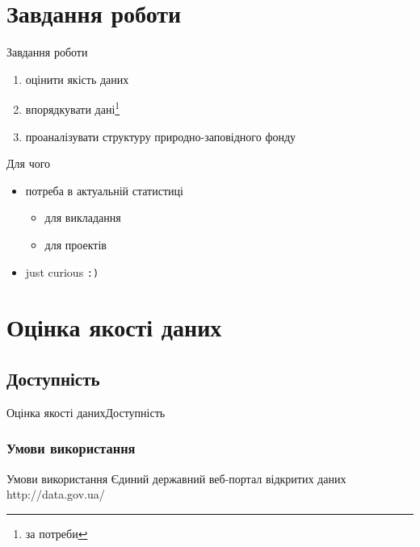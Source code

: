 \documentclass[12pt, aspectratio=1610]{beamer}
\begin{document}
\section{Завдання роботи}
\begin{frame}{Завдання роботи}
   \begin{enumerate}
    \item оцінити якість даних
    \item впорядкувати дані\footnote{за потреби}
    \item проаналізувати структуру природно-заповідного фонду
   \end{enumerate}
  \begin{block}{Для чого}
  	\begin{itemize}
  		\item потреба в актуальній статистиці
  		\begin{itemize}
  			\item для викладання
  			\item для проектів
  		\end{itemize}
  	    \item just curious {\tt :)}
  	\end{itemize}
  \end{block}
\end{frame}

\section{Оцінка якості даних}
\subsection{Доступність}
\begin{frame}{Оцінка якості даних}{Доступність}
\subsubsection{Умови використання}	
	\begin{block}{Умови використання}
	{Єдиний державний веб-портал відкритих даних}%
	{http://data.gov.ua/}  
	\end{block}
\end{frame}
\end{document}
